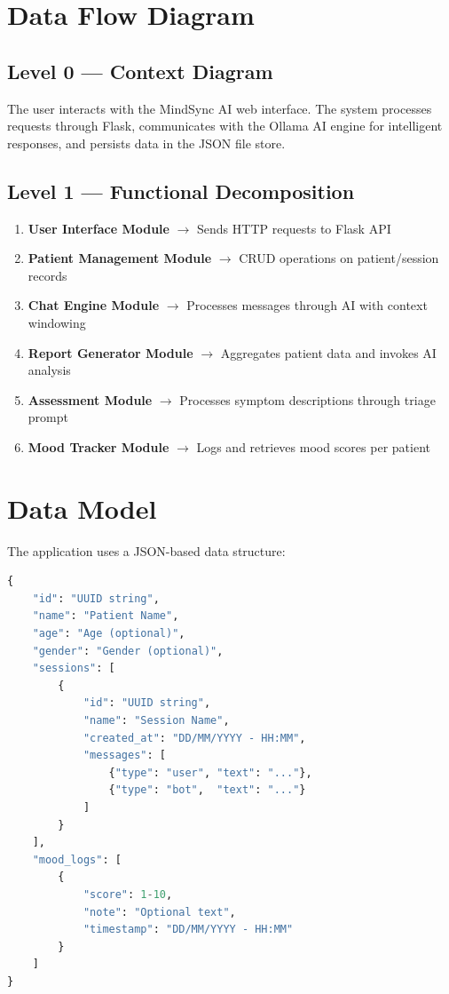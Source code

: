 \documentclass[12pt,a4paper]{report}
\begin{document}
\section{Data Flow Diagram}

\subsection{Level 0 — Context Diagram}

The user interacts with the MindSync AI web interface. The system processes requests through Flask, communicates with the Ollama AI engine for intelligent responses, and persists data in the JSON file store.

\subsection{Level 1 — Functional Decomposition}

\begin{enumerate}
    \item \textbf{User Interface Module} $\rightarrow$ Sends HTTP requests to Flask API
    \item \textbf{Patient Management Module} $\rightarrow$ CRUD operations on patient/session records
    \item \textbf{Chat Engine Module} $\rightarrow$ Processes messages through AI with context windowing
    \item \textbf{Report Generator Module} $\rightarrow$ Aggregates patient data and invokes AI analysis
    \item \textbf{Assessment Module} $\rightarrow$ Processes symptom descriptions through triage prompt
    \item \textbf{Mood Tracker Module} $\rightarrow$ Logs and retrieves mood scores per patient
\end{enumerate}

\section{Data Model}

The application uses a JSON-based data structure:

\begin{lstlisting}[language=Python, caption=Patient Data Structure]
{
    "id": "UUID string",
    "name": "Patient Name",
    "age": "Age (optional)",
    "gender": "Gender (optional)",
    "sessions": [
        {
            "id": "UUID string",
            "name": "Session Name",
            "created_at": "DD/MM/YYYY - HH:MM",
            "messages": [
                {"type": "user", "text": "..."},
                {"type": "bot",  "text": "..."}
            ]
        }
    ],
    "mood_logs": [
        {
            "score": 1-10,
            "note": "Optional text",
            "timestamp": "DD/MM/YYYY - HH:MM"
        }
    ]
}
\end{lstlisting}
\end{document}
